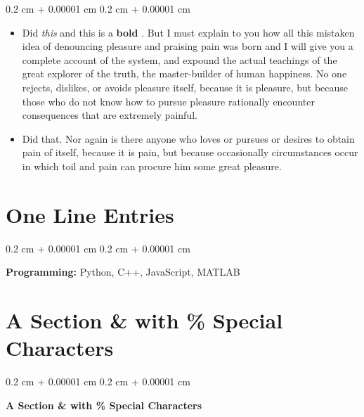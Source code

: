 \documentclass[10pt, letterpaper]{article}
\newenvironment{highlights}{
    \begin{itemize}[
        topsep=0.10 cm,
        parsep=0.10 cm,
        partopsep=0pt,
        itemsep=0pt,
        leftmargin=0.4 cm + 10pt
    ]
}{
    \end{itemize}
} %
\newenvironment{onecolentry}{
    \begin{adjustwidth}{
        0.2 cm + 0.00001 cm
    }{
        0.2 cm + 0.00001 cm
    }
}{
    \end{adjustwidth}
} %
\let\hrefWithoutArrow\href
\renewcommand{\href}[2]{\hrefWithoutArrow{#1}{\ifthenelse{\equal{#2}{}}{ }{#2 }\raisebox{.15ex}{\footnotesize \faExternalLink*}}}
\begin{document}
        \vspace{0.10 cm}
        \begin{onecolentry}
            \begin{highlights}
                \item Did \textit{this} and this is a \textbf{bold} \href{https://example.com}{link}. But I must explain to you how all this mistaken idea of denouncing pleasure and praising pain was born and I will give you a complete account of the system, and expound the actual teachings of the great explorer of the truth, the master-builder of human happiness. No one rejects, dislikes, or avoids pleasure itself, because it is pleasure, but because those who do not know how to pursue pleasure rationally encounter consequences that are extremely painful.
                \item Did that. Nor again is there anyone who loves or pursues or desires to obtain pain of itself, because it is pain, but because occasionally circumstances occur in which toil and pain can procure him some great pleasure.
            \end{highlights}
        \end{onecolentry}



    
    \section{One Line Entries}



        
        \begin{onecolentry}
            \textbf{Pro\textnormal{gram}ming:} Python, C++, JavaScript, MATLAB
        \end{onecolentry}


    
    \section{A Section \& with \% Special Characters}



        
        \begin{onecolentry}
            \textbf{A Section \& with \% Special Characters}
        \end{onecolentry}




    
\end{document}
